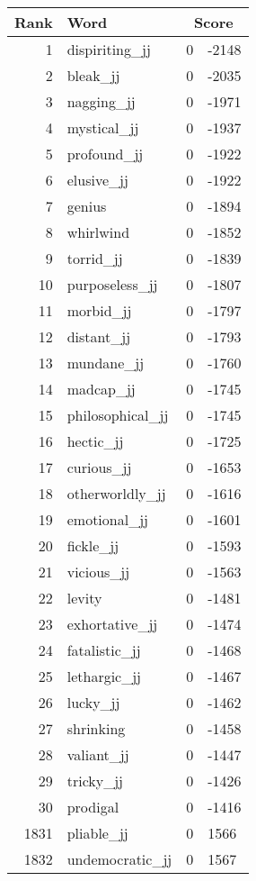 \begin{longtable}[!htbp]{| rlr@{.}l |}
    \hline
    \textbf{Rank} & \textbf{Word} & \multicolumn{2}{c|}{\textbf{Score}} \\
    \hline
    \endhead
    1 & dispiriting\_jj & 0 & -2148 \\
    2 & bleak\_jj & 0 & -2035 \\
    3 & nagging\_jj & 0 & -1971 \\
    4 & mystical\_jj & 0 & -1937 \\
    5 & profound\_jj & 0 & -1922 \\
    6 & elusive\_jj & 0 & -1922 \\
    7 & genius & 0 & -1894 \\
    8 & whirlwind & 0 & -1852 \\
    9 & torrid\_jj & 0 & -1839 \\
    10 & purposeless\_jj & 0 & -1807 \\
    11 & morbid\_jj & 0 & -1797 \\
    12 & distant\_jj & 0 & -1793 \\
    13 & mundane\_jj & 0 & -1760 \\
    14 & madcap\_jj & 0 & -1745 \\
    15 & philosophical\_jj & 0 & -1745 \\
    16 & hectic\_jj & 0 & -1725 \\
    17 & curious\_jj & 0 & -1653 \\
    18 & otherworldly\_jj & 0 & -1616 \\
    19 & emotional\_jj & 0 & -1601 \\
    20 & fickle\_jj & 0 & -1593 \\
    21 & vicious\_jj & 0 & -1563 \\
    22 & levity & 0 & -1481 \\
    23 & exhortative\_jj & 0 & -1474 \\
    24 & fatalistic\_jj & 0 & -1468 \\
    25 & lethargic\_jj & 0 & -1467 \\
    26 & lucky\_jj & 0 & -1462 \\
    27 & shrinking & 0 & -1458 \\
    28 & valiant\_jj & 0 & -1447 \\
    29 & tricky\_jj & 0 & -1426 \\
    30 & prodigal & 0 & -1416 \\
    1831 & pliable\_jj & 0 & 1566 \\
    1832 & undemocratic\_jj & 0 & 1567 \\

\end{longtable}
